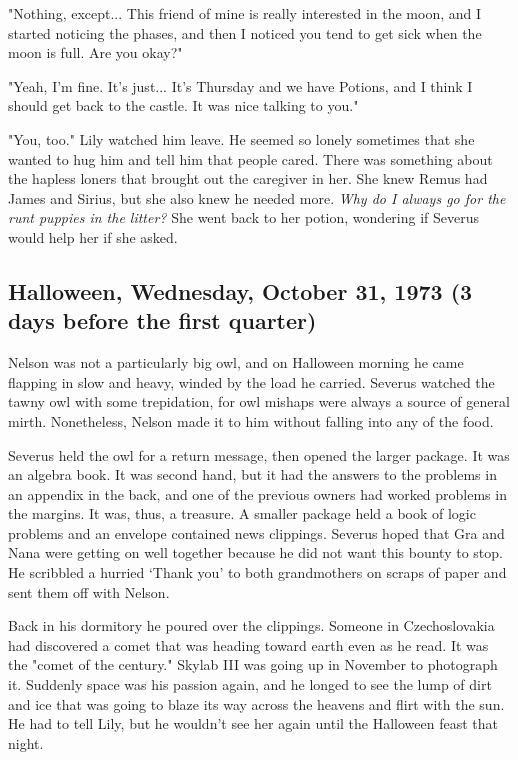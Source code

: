 "Nothing, except... This friend of mine is really interested in the moon, and I started noticing the phases, and then I noticed you tend to get sick when the moon is full. Are you okay?"

"Yeah, I'm fine. It's just... It's Thursday and we have Potions, and I think I should get back to the castle. It was nice talking to you."

"You, too." Lily watched him leave. He seemed so lonely sometimes that she wanted to hug him and tell him that people cared. There was something about the hapless loners that brought out the caregiver in her. She knew Remus had James and Sirius, but she also knew he needed more. \emph{Why do I always go for the runt puppies in the litter?} She went back to her potion, wondering if Severus would help her if she asked.

\subsection{Halloween, Wednesday, October 31, 1973 (3 days before the first quarter)}

Nelson was not a particularly big owl, and on Halloween morning he came flapping in slow and heavy, winded by the load he carried. Severus watched the tawny owl with some trepidation, for owl mishaps were always a source of general mirth. Nonetheless, Nelson made it to him without falling into any of the food.

Severus held the owl for a return message, then opened the larger package. It was an algebra book. It was second hand, but it had the answers to the problems in an appendix in the back, and one of the previous owners had worked problems in the margins. It was, thus, a treasure. A smaller package held a book of logic problems and an envelope contained news clippings. Severus hoped that Gra and Nana were getting on well together because he did not want this bounty to stop. He scribbled a hurried `Thank you' to both grandmothers on scraps of paper and sent them off with Nelson.

Back in his dormitory he poured over the clippings. Someone in Czechoslovakia had discovered a comet that was heading toward earth even as he read. It was the "comet of the century." Skylab III was going up in November to photograph it. Suddenly space was his passion again, and he longed to see the lump of dirt and ice that was going to blaze its way across the heavens and flirt with the sun. He had to tell Lily, but he wouldn't see her again until the Halloween feast that night.

